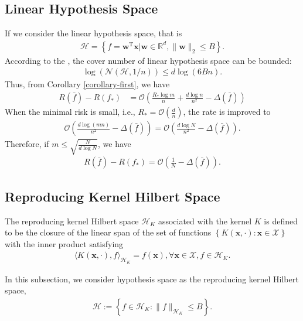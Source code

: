\documentclass{article}
\begin{document}
\subsection{Linear Hypothesis Space}
\label{subsection-3.1}
If we consider the linear hypothesis space, that is
\begin{align*}
\mathcal{H}=\left\{f=\mathbf w^\mathrm T\mathbf x|\mathbf w\in \mathbb{R}^d, \|\mathbf w\|_2\leq B\right\}.
\end{align*}
According to the \cite{pisier1999volume},
the cover number of linear hypothesis space can be bounded:
\begin{align*}
  \log\left(\mathcal{N}(\mathcal{H},1/n)\right)\leq d\log \left(6Bn\right).
\end{align*}
Thus, from Corollary \ref{corollary-first}, we have
\begin{align*}
  R(\bar{f})-R(f_\ast)&=\mathcal{O}\left(\frac{R_\ast\log m}{n}+\frac{d\log n}{n^2}-
  \Delta(\bar{f})\right)
\end{align*}
When the minimal risk is small, i.e., $R_\ast=\mathcal{O}\left(\frac{d}{n}\right)$,
the rate is improved to
\begin{align*}
    \mathcal{O}\left(\frac{d\log (mn)}{n^2}-\Delta(\bar{f})\right)=\mathcal{O}\left(\frac{d\log N}{n^2}-\Delta(\bar{f})\right).
\end{align*}
Therefore, if $m\leq \sqrt{\frac{N}{d\log N}}$, we have
\begin{align*}
    R(\bar{f})-R(f_\ast)=\mathcal{O}\left(\frac{1}{N}-\Delta(\bar{f})\right).
\end{align*}
\subsection{Reproducing Kernel Hilbert Space}
\label{subsection-3.2}
The reproducing kernel Hilbert space $\mathcal{H}_K$ associated with the kernel $K$ is
defined to be the closure of the linear span of the set of functions
$\left\{K(\mathbf x,\cdot):\mathbf x\in\mathcal{X}\right\}$ with the inner product satisfying
\begin{align*}
  \langle K(\mathbf x,\cdot), f\rangle_{\mathcal{H}_K}=f(\mathbf x), \forall \mathbf x\in\mathcal{X}, f\in\mathcal{H}_K.
\end{align*}

In this subsection, we consider hypothesis space as the reproducing kernel Hilbert space,
\begin{align*}
  \mathcal{H}:=\left\{f\in\mathcal{H}_{K}: \|f\|_{\mathcal{H}_K}\leq B\right\}.
\end{align*}
\end{document}
